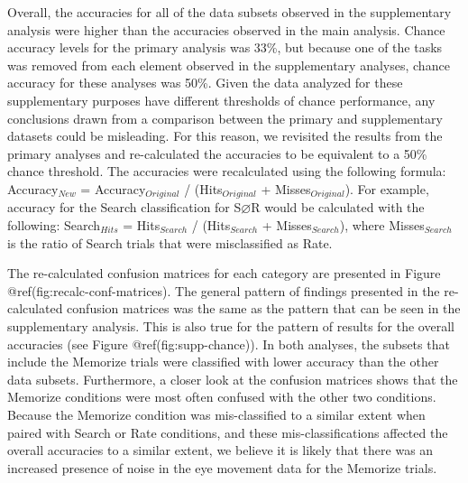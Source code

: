 \begin{appendix}
Overall, the accuracies for all of the data subsets observed in the
supplementary analysis were higher than the accuracies observed in the
main analysis. Chance accuracy levels for the primary analysis was 33\%,
but because one of the tasks was removed from each element observed in
the supplementary analyses, chance accuracy for these analyses was 50\%.
Given the data analyzed for these supplementary purposes have different
thresholds of chance performance, any conclusions drawn from a
comparison between the primary and supplementary datasets could be
misleading. For this reason, we revisited the results from the primary
analyses and re-calculated the accuracies to be equivalent to a 50\%
chance threshold. The accuracies were recalculated using the following
formula: Accuracy\(_{New}\) = Accuracy\(_{Original}\) /
(Hits\(_{Original}\) + Misses\(_{Original}\)). For example, accuracy for
the Search classification for S\(\varnothing\)R would be calculated with
the following: Search\(_{Hits}\) = Hits\(_{Search}\) /
(Hits\(_{Search}\) + Misses\(_{Search}\)), where Misses\(_{Search}\) is
the ratio of Search trials that were misclassified as Rate.

The re-calculated confusion matrices for each category are presented in
Figure @ref(fig:recalc-conf-matrices). The general pattern of findings
presented in the re-calculated confusion matrices was the same as the
pattern that can be seen in the supplementary analysis. This is also
true for the pattern of results for the overall accuracies (see Figure
@ref(fig:supp-chance)). In both analyses, the subsets that include the
Memorize trials were classified with lower accuracy than the other data
subsets. Furthermore, a closer look at the confusion matrices shows that
the Memorize conditions were most often confused with the other two
conditions. Because the Memorize condition was mis-classified to a
similar extent when paired with Search or Rate conditions, and these
mis-classifications affected the overall accuracies to a similar extent,
we believe it is likely that there was an increased presence of noise in
the eye movement data for the Memorize trials.


\end{appendix}
